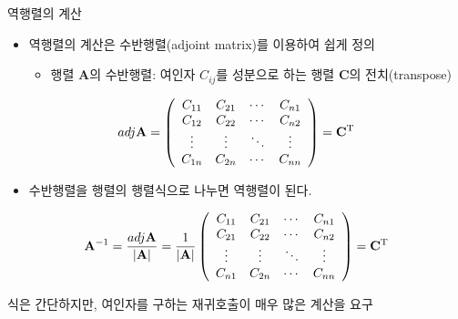 \begin{frame}{역행렬의 계산}

\begin{itemize}
\item 역행렬의 계산은 수반행렬(adjoint matrix)를 이용하여 쉽게 정의
	\begin{itemize}
	\item 행렬 $\mathbf A$의 수반행렬: 여인자 $C_{ij}$를 성분으로 하는 행렬 $\mathbf C$의 전치(transpose)
	\end{itemize}
\end{itemize}


$$ adj \mathbf A = 
\left (
\begin{array}{cccc}
C_{11} & C_{21} & \cdots & C_{n1} \\
C_{12} & C_{22} & \cdots & C_{n2} \\
\vdots & \vdots & \ddots & \vdots \\
C_{1n} & C_{2n} & \cdots & C_{nn} \\
\end{array}
\right )
= \mathbf C^{\rm T}
$$
 
\begin{itemize}
\item 수반행렬을 행렬의 행렬식으로 나누면 역행렬이 된다.
\end{itemize}

$$\mathbf A^{-1} = \frac{adj \mathbf A}{|\mathbf A|} = 
\frac{1}{|\mathbf A|}
\left (
\begin{array}{cccc}
C_{11} & C_{21} & \cdots & C_{n1} \\
C_{21} & C_{22} & \cdots & C_{n2} \\
\vdots & \vdots & \ddots & \vdots \\
C_{n1} & C_{2n} & \cdots & C_{nn} \\
\end{array}
\right )
= \mathbf C^{\rm T}
$$

식은 간단하지만, 여인자를 구하는 재귀호출이 매우 많은 계산을 요구

\end{frame}
